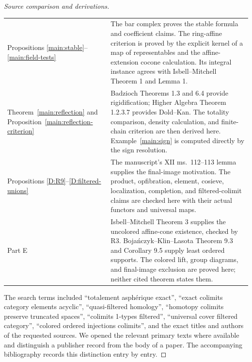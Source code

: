 \documentclass[11pt,a4paper]{article}
\theoremstyle{definition}
\begin{document}
\begin{proof}[Source comparison and derivations]
\begin{longtable}{@{}p{}p{}@{}}
Propositions \ref{main:stable}--\ref{main:field-tests} & The bar complex proves the stable formula and coefficient claims. The ring-affine criterion is proved by the explicit kernel of a map of representables and the affine-extension cocone calculation. Its integral instance agrees with Isbell--Mitchell Theorem 1 and Lemma 1.\\
Theorem~\ref{main:reflection} and Proposition~\ref{main:reflection-criterion} & Badzioch Theorems 1.3 and 6.4 provide rigidification; Higher Algebra Theorem 1.2.3.7 provides Dold--Kan. The totality comparison, density calculation, and finite-chain criterion are then derived here. Example~\ref{main:sign} is computed directly by the sign resolution.\\
Propositions \ref{D:R9}--\ref{D:filtered-unions} & The manuscript's XII ms.\ 112--113 lemma supplies the final-image motivation. The product, opfibration, element, cosieve, localization, completion, and filtered-colimit claims are checked here with their actual functors and universal maps.\\
Part E & Isbell--Mitchell Theorem 3 supplies the uncolored affine-cone existence, checked by R3. Boja\'nczyk--Klin--Lasota Theorem 9.3 and Corollary 9.5 supply least ordered supports. The colored lift, group diagrams, and final-image exclusion are proved here; neither cited theorem states them.\\
\bottomrule
\end{longtable}
The search terms included ``totalement asph\'erique exact'', ``exact colimits category elements acyclic'', ``quasi-filtered homology'', ``homotopy colimits preserve truncated spaces'', ``colimits 1-types filtered'', ``universal cover filtered category'', ``colored ordered injections colimits'', and the exact titles and authors of the requested sources. We opened the relevant primary texts where available and distinguish a publisher record from the body of a paper. The accompanying bibliography records this distinction entry by entry.
\end{proof}
\end{document}
